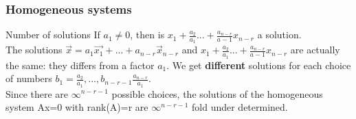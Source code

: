 \begin{frame}
	\frametitle{Homogeneous systems}
	\begin{block}{Number of solutions}
		If $a_1\neq0$, then is $x_1+\frac{a_2}{a_1}...+\frac{a_{n-r}}{a-1}x_{n-r}$ a solution.\\
		The solutions $\overrightarrow{x}=a_1\overrightarrow{x_1}+...+a_{n-r}\overrightarrow{x}_{n-r}$ and $x_1+\frac{a_2}{a_1}...+\frac{a_{n-r}}{a-1}x_{n-r}$ are actually the same: they differs from a factor $a_1$. 
		We get \textbf{different} solutions for each choice of numbers $b_1=\frac{a_2}{a_1},...,b_{n-r-1}\frac{a_{n-r}}{a_1}$. \\
		\vspace{4mm}
		Since there are $\infty^{n-r-1}$ possible choices, the solutions of the homogeneous system Ax=0 with rank(A)=r are $\infty^{n-r-1}$ fold under determined.
	\end{block}
\end{frame}

